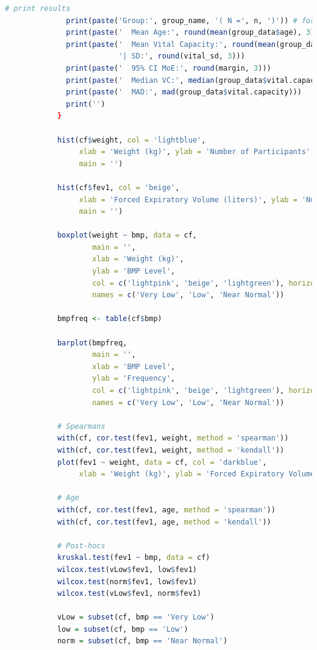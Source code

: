 \documentclass{article}
\begin{document}
\begin{lstlisting}[language=R, basicstyle=\tiny]
			  # print results
			  print(paste('Group:', group_name, '( N =', n, ')')) # for future reference: paste() used to concatenate strings
			  print(paste('  Mean Age:', round(mean(group_data$age), 3))) # prints mean age
			  print(paste('  Mean Vital Capacity:', round(mean(group_data$vital.capacity), 3),
						  '| SD:', round(vital_sd, 3)))
			  print(paste('  95% CI MoE:', round(margin, 3)))
			  print(paste('  Median VC:', median(group_data$vital.capacity)))
			  print(paste('  MAD:', mad(group_data$vital.capacity)))
			  print('')
			}
			
			hist(cf$weight, col = 'lightblue',
				 xlab = 'Weight (kg)', ylab = 'Number of Participants',
				 main = '')
			
			hist(cf$fev1, col = 'beige',
				 xlab = 'Forced Expiratory Volume (liters)', ylab = 'Number of Participants',
				 main = '')
			
			boxplot(weight ~ bmp, data = cf, 
					main = '',
					xlab = 'Weight (kg)', 
					ylab = 'BMP Level', 
					col = c('lightpink', 'beige', 'lightgreen'), horizontal = T,
					names = c('Very Low', 'Low', 'Near Normal'))
			
			bmpfreq <- table(cf$bmp)

			barplot(bmpfreq,
			        main = '',
			        xlab = 'BMP Level', 
			        ylab = 'Frequency', 
			        col = c('lightpink', 'beige', 'lightgreen'), horizontal = T,
			        names = c('Very Low', 'Low', 'Near Normal'))
			
			# Spearmans
			with(cf, cor.test(fev1, weight, method = 'spearman'))
			with(cf, cor.test(fev1, weight, method = 'kendall'))
			plot(fev1 ~ weight, data = cf, col = 'darkblue',
				 xlab = 'Weight (kg)', ylab = 'Forced Expiratory Volume (liters)')
			
			# Age
			with(cf, cor.test(fev1, age, method = 'spearman'))
			with(cf, cor.test(fev1, age, method = 'kendall'))
			
			# Post-hocs
			kruskal.test(fev1 ~ bmp, data = cf)
			wilcox.test(vLow$fev1, low$fev1)
			wilcox.test(norm$fev1, low$fev1)
			wilcox.test(vLow$fev1, norm$fev1)
			
			vLow = subset(cf, bmp == 'Very Low')
			low = subset(cf, bmp == 'Low')
			norm = subset(cf, bmp == 'Near Normal')
			\end{lstlisting}
			
			






		


		
\end{document}
